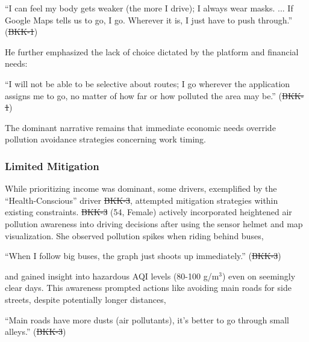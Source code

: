 \documentclass[sigconf,screen,natbib=true]{acmart}
\providecommand{\DIFadd}[1]{{\protect\color{blue}\uwave{#1}}} %
\providecommand{\DIFdel}[1]{{\protect\color{red}\sout{#1}}} %
\providecommand{\DIFaddbegin}{} %
\providecommand{\DIFaddend}{} %
\providecommand{\DIFdelbegin}{} %
\providecommand{\DIFdelend}{} %
\begin{document}
\begin{quoteb}
    ``I can feel my body gets weaker (the more I drive); I always wear masks. ... If Google Maps tells us to go, I go. Wherever it is, I just have to push through.'' (\DIFdelbegin \DIFdel{BKK-1}\DIFdelend \DIFaddbegin \DIFadd{BKK1}\DIFaddend )
\end{quoteb}

He further emphasized the lack of choice dictated by the platform and financial needs:

\begin{quoteb}
    ``I will not be able to be selective about routes; I go wherever the application assigns me to go, no matter of how far or how polluted the area may be.'' (\DIFdelbegin \DIFdel{BKK-1}\DIFdelend \DIFaddbegin \DIFadd{BKK1}\DIFaddend )
\end{quoteb}





The dominant narrative remains that immediate economic needs override pollution avoidance strategies concerning work timing.

\subsubsection{Limited Mitigation}
While prioritizing income was dominant, some drivers, exemplified by the ``Health-Conscious'' driver \DIFdelbegin \DIFdel{BKK-3}\DIFdelend \DIFaddbegin \DIFadd{BKK3}\DIFaddend , attempted mitigation strategies within existing constraints.
\DIFdelbegin \DIFdel{BKK-3 }\DIFdelend \DIFaddbegin \DIFadd{BKK3 }\DIFaddend (54, Female) actively incorporated heightened air pollution awareness into driving decisions after using the sensor helmet and map visualization.
She observed pollution spikes when riding behind buses,
\begin{quoteb}
    ``When I follow big buses, the graph just shoots up immediately.'' (\DIFdelbegin \DIFdel{BKK-3}\DIFdelend \DIFaddbegin \DIFadd{BKK3}\DIFaddend )
\end{quoteb}

and gained insight into hazardous AQI levels (80-100 \textmu{}g/m$^3$) even on seemingly clear days. This awareness prompted actions like avoiding main roads for side streets, despite potentially longer distances,
\begin{quoteb}
    ``Main roads have more dusts (air pollutants), it’s better to go through small alleys.'' (\DIFdelbegin \DIFdel{BKK-3}\DIFdelend \DIFaddbegin \DIFadd{BKK3}\DIFaddend )
\end{quoteb}
\end{document}
